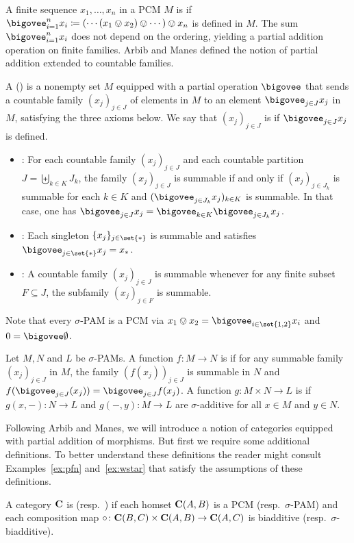 \documentclass[%
	submission,
copyright,creativecommons,UKenglish]{eptcs}
\begin{document}
A finite sequence $x_1,\dotsc,x_n$ in a PCM $M$ is 
if $\bigovee_{i=1}^n x_i \coloneqq
(\dotsb (x_1\ovee x_2)\ovee \dotsb)\ovee x_n$
is defined in $M$.
The sum $\bigovee_{i=1}^n x_i$ does not depend on the ordering,
yielding a partial addition operation on finite families.
Arbib and Manes defined the notion of partial addition
extended to countable families.

\begin{definition}
A  ()
is a nonempty set $M$
equipped with
a partial operation $\bigovee$ that sends
a countable family $(x_j)_{j\in J}$ of elements in $M$
to an element $\bigovee_{j\in J}x_j$ in $M$,
satisfying the three axioms below.
We say that $(x_j)_{j\in J}$ is  if
$\bigovee_{j\in J}x_j$ is defined.
\begin{itemize}
\item {}:
For each countable family $(x_j)_{j\in J}$
and each countable partition
$J=\biguplus_{k\in K} J_k$,
the family $(x_j)_{j\in J}$ is summable if and only if
$(x_j)_{j\in J_k}$ is summable for each $k\in K$
and $(\bigovee_{j\in J_k} x_j)_{k\in K}$ is summable.
In that case, one has
$\bigovee_{j\in J} x_j
=
\bigovee_{k\in K}
\bigovee_{j\in J_k} x_j$.
\item {}:
Each singleton $\{x_j\}_{j\in \set{*}}$
is summable and satisfies $\bigovee_{j\in \set{*}} x_j=x_{*}$.
\item {}:
A countable family $(x_j)_{j\in J}$
is summable
whenever
for any finite subset $F\subseteq J$,
the subfamily $(x_j)_{j\in F}$ is summable.
\end{itemize}
Note that every $\sigma$-PAM is a PCM via
$x_1\ovee x_2=\bigovee_{i\in\set{1,2}} x_i$
and $0=\bigovee\emptyset$.

Let $M,N$ and $L$ be $\sigma$-PAMs.
A function $f\colon M\to N$ is 
if for any summable family $(x_j)_{j\in J}$ in $M$,
the family $(f(x_j))_{j\in J}$ is summable in $N$
and $f(\bigovee_{j\in J}(x_j))=\bigovee_{j\in J} f(x_j)$.
A function $g\colon M\times N\to L$
is 
if $g(x,-)\colon N\to L$
and $g(-,y)\colon M\to L$ are $\sigma$-additive
for all $x\in M$ and $y\in N$.
\end{definition}

Following Arbib and Manes, we will introduce
a notion of categories equipped with
partial addition of morphisms.
But first we require some additional definitions.
To better understand these definitions the reader might consult Examples~\ref{ex:pfn} and~\ref{ex:wstar} that satisfy the assumptions of these definitions.
\begin{definition}
A category $\mathbf{C}$
is 
(resp.\ )
if each homset $\mathbf{C}(A,B)$ is a PCM
(resp.\ $\sigma$-PAM)
and each composition map
$\circ\colon\mathbf{C}(B,C)\times \mathbf{C}(A,B)\to \mathbf{C}(A,C)$
is biadditive (resp.~$\sigma$-biadditive).
\end{definition}
\end{document}
